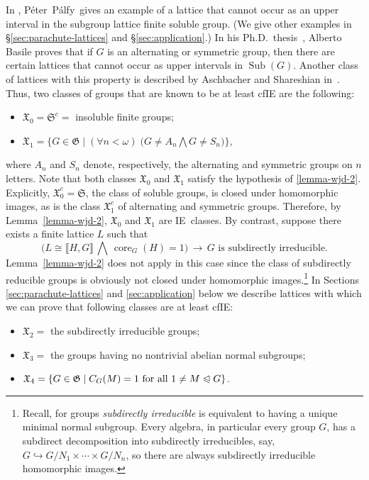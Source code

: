 \documentclass{gen-j-l}
\newcommand{\lb}{\ensuremath{\llbracket}}
\newcommand{\rb}{\ensuremath{\rrbracket}}
\newcommand{\<}{\ensuremath{\langle}}
\renewcommand{\>}{\ensuremath{\rangle}}
\theoremstyle{plain}
\theoremstyle{definition}
\theoremstyle{remark}
\numberwithin{theorem}{section}
\numberwithin{claim}{section}
\numberwithin{equation}{section}
\numberwithin{conjecture}{section}
\newcommand{\Peter}{P{\'e}ter}
\newcommand{\Palfy}{P\'alfy}
\newcommand{\defn}[1]{\emph{#1}}
\newcommand{\subnormal}{\ensuremath{\trianglelefteqslant}}
\newcommand{\Meet}{\ensuremath{\bigwedge}}
\newcommand{\Sub}{\ensuremath{\operatorname{Sub}}}
\newcommand{\core}{\ensuremath{\operatorname{core}}}
\newcommand{\2}{\ensuremath{\mathbf{2}}}
\newcommand{\3}{\ensuremath{\mathbf{3}}}
\newcommand{\sG}{\ensuremath{\mathfrak{X}}}
\newcommand{\G}{\ensuremath{\mathfrak{G}}}
\newcommand{\IE}{{\small IE}}
\begin{document}
In \cite{Palfy:1995}, \Peter\ \Palfy\ gives an example of a lattice that cannot occur as an
upper interval in the subgroup lattice finite soluble group.  (We give other examples
in \S\ref{sec:parachute-lattices} and \S\ref{sec:application}.)
In his Ph.D.~thesis~\cite{Basile:2001}, Alberto Basile proves that if
$G$ is an alternating or symmetric group, then there are certain lattices that
cannot occur as upper intervals in $\Sub(G)$. Another class of lattices with
this property is described by Aschbacher and Shareshian in~\cite{Aschbacher:2009}. 
Thus, two classes of groups that are known to be at least \acs{cfIE} are the following:
\begin{itemize}
\item $\sG_0 = \mathfrak{S}^c = $ insoluble finite groups;
\item $\sG_1 =\bigl\{G\in \G \mid (\forall n<\omega) \; \bigl(G \neq A_n \Meet  G\neq S_n\bigr) \bigr\}$,
\end{itemize}
where $A_n$ and $S_n$ denote, respectively,
the alternating and symmetric groups on
$n$ letters.
Note that both classes $\sG_0$ and $\sG_1$ satisfy the hypothesis of \ref{lemma-wjd-2}.
Explicitly, $\sG_0^c = \mathfrak{S}$, the class of soluble groups, is closed under homomorphic
images, as is the class $\sG_1^c$ of alternating and symmetric groups. 
Therefore, by Lemma~\ref{lemma-wjd-2}, $\sG_0$ and $\sG_1$ are \IE\ classes.
By contrast, suppose %
there exists a finite lattice $L$ such that
 \[
 \bigl(L \cong \lb H, G \rb \,\Meet\, \core_G(H)=1\bigr) \, \longrightarrow \, G
 \text{ is subdirectly irreducible.}  %
\]
Lemma~\ref{lemma-wjd-2} does not apply in this case since the class of
subdirectly reducible groups is obviously not closed under homomorphic 
images.\footnote{Recall, for groups \defn{subdirectly irreducible} is equivalent
  to having a unique minimal normal subgroup.
 Every algebra, in particular every group $G$, has a subdirect
  decomposition into subdirectly irreducibles, say, $G\hookrightarrow G/N_1 \times \cdots\times
  G/N_n$, so there are always  subdirectly irreducible homomorphic images.}
In Sections \ref{sec:parachute-lattices} and \ref{sec:application} below we describe
lattices with which we can prove that following classes are at least 
\acs{cfIE}: 
\begin{itemize}
\item $\sG_2 = $ the subdirectly irreducible groups;
\item $\sG_3 = $ the groups having no nontrivial abelian normal subgroups;
\item $\sG_4 = \{G\in \G \mid C_G(M) = 1 \text{ for all } 1\neq M\subnormal G\}$.
\end{itemize}
\end{document}

